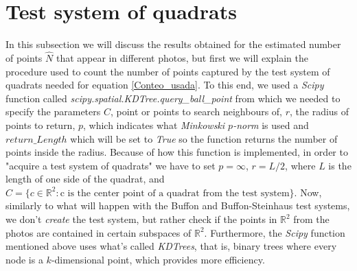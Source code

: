 \section{Test system of quadrats}
In this subsection we will discuss the results obtained for the estimated number of points $\widehat{N}$ that appear in different photos, but first we will explain the procedure used to count the number of points captured by the test system of quadrats needed for equation \eqref{Conteo_usada}. To this end, we used a \textit{Scipy} function called \textit{scipy.spatial.KDTree.query\_ball\_point} from which we needed to specify the parameters $C$, point or points to search neighbours of, $r$, the radius of points to return, $p$, which indicates what \textit{Minkowski $p$-norm} is used and $return\_Length$ which will be set to \textit{True} so the function returns the number of points inside the radius. Because of how this function is implemented, in order to "acquire a test system of quadrats" we have to set $p = \infty$, $r=L/2$, where $L$ is the length of one side of the quadrat, and $C=\{ c \in \mathbb{R}^2 : \text{c is the center point of a quadrat from the test system} \}$. Now, similarly to what will happen with the Buffon and Buffon-Steinhaus test systems, we don't \textit{create} the test system, but rather check if the points in $\mathbb{R}^2$ from the photos are contained in certain subspaces of $\mathbb{R}^2$. Furthermore, the \textit{Scipy} function mentioned above uses what's called \textit{KDTrees}, that is, binary trees where every node is a $k$-dimensional point, which provides more efficiency.\\


